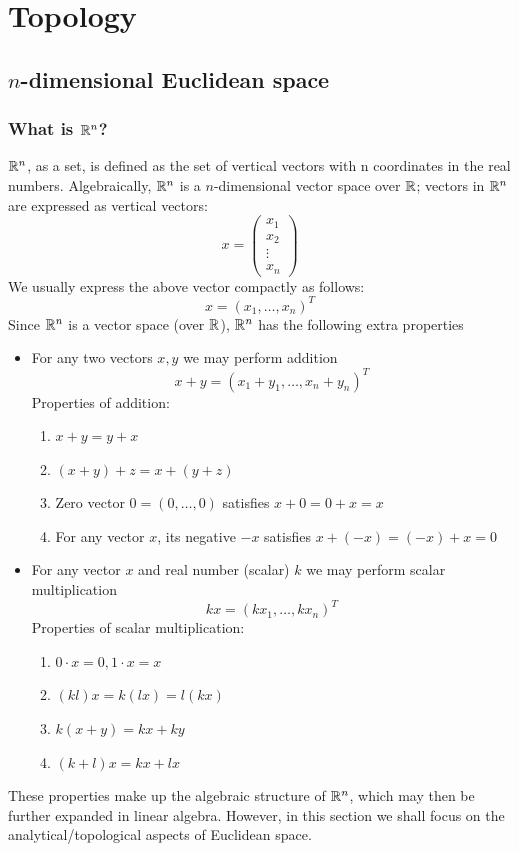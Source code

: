 \part{Topology}
\chapter{$n$-dimensional Euclidean space}
\section{What is $\mathbb R^n$?}
$\mathbb R^n$, as a set, is defined as the set of vertical vectors with n coordinates in the real numbers. Algebraically, $\mathbb R^n$ is a $n$-dimensional vector space over $\mathbb R$; vectors in $\mathbb R^n$ are expressed as vertical vectors:
\[ x=\begin{pmatrix} x_1 \\ x_2 \\ \vdots \\ x_n \end{pmatrix} \]
We usually express the above vector compactly as follows:
\[ x=(x_1,\dots,x_n)^T \]
Since $\mathbb R^n$ is a vector space (over $\mathbb R$), $\mathbb R^n$ has the following extra properties
\begin{itemize}
\item For any two vectors $x,y$ we may perform addition
\[ x+y=(x_1+y_1,\dots,x_n+y_n)^T \]
Properties of addition:
\begin{enumerate}
\item $x+y=y+x$
\item $(x+y)+z=x+(y+z)$
\item Zero vector $0=(0,\dots,0)$ satisfies $x+0=0+x=x$
\item For any vector $x$, its negative $-x$ satisfies $x+(-x)=(-x)+x=0$
\end{enumerate}
\item For any vector $x$ and real number (scalar) $k$ we may perform scalar multiplication
\[ kx=(kx_1,\dots,kx_n)^T \]
Properties of scalar multiplication:
\begin{enumerate}
\item $0\cdot x=0,1\cdot x=x$
\item $(kl)x=k(lx)=l(kx)$
\item $k(x+y)=kx+ky$
\item $(k+l)x=kx+lx$
\end{enumerate}
\end{itemize}

These properties make up the algebraic structure of $\mathbb R^n$, which may then be further expanded in linear algebra. However, in this section we shall focus on the analytical/topological aspects of Euclidean space.

